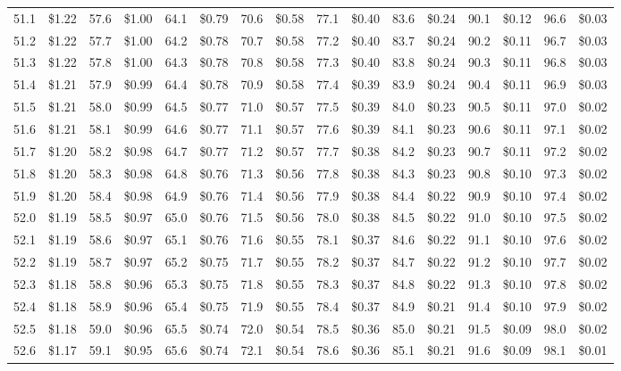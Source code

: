 \documentclass{article}
\begin{document}
\begin{tabular}{|*{8}{rr|}}
51.1 & \$1.22 & 57.6 & \$1.00 & 64.1 & \$0.79 & 70.6 & \$0.58 & 77.1 & \$0.40 & 83.6 & \$0.24 & 90.1 & \$0.12 & 96.6 & \$0.03\\
51.2 & \$1.22 & 57.7 & \$1.00 & 64.2 & \$0.78 & 70.7 & \$0.58 & 77.2 & \$0.40 & 83.7 & \$0.24 & 90.2 & \$0.11 & 96.7 & \$0.03\\
51.3 & \$1.22 & 57.8 & \$1.00 & 64.3 & \$0.78 & 70.8 & \$0.58 & 77.3 & \$0.40 & 83.8 & \$0.24 & 90.3 & \$0.11 & 96.8 & \$0.03\\
51.4 & \$1.21 & 57.9 & \$0.99 & 64.4 & \$0.78 & 70.9 & \$0.58 & 77.4 & \$0.39 & 83.9 & \$0.24 & 90.4 & \$0.11 & 96.9 & \$0.03\\
51.5 & \$1.21 & 58.0 & \$0.99 & 64.5 & \$0.77 & 71.0 & \$0.57 & 77.5 & \$0.39 & 84.0 & \$0.23 & 90.5 & \$0.11 & 97.0 & \$0.02\\
51.6 & \$1.21 & 58.1 & \$0.99 & 64.6 & \$0.77 & 71.1 & \$0.57 & 77.6 & \$0.39 & 84.1 & \$0.23 & 90.6 & \$0.11 & 97.1 & \$0.02\\
51.7 & \$1.20 & 58.2 & \$0.98 & 64.7 & \$0.77 & 71.2 & \$0.57 & 77.7 & \$0.38 & 84.2 & \$0.23 & 90.7 & \$0.11 & 97.2 & \$0.02\\
51.8 & \$1.20 & 58.3 & \$0.98 & 64.8 & \$0.76 & 71.3 & \$0.56 & 77.8 & \$0.38 & 84.3 & \$0.23 & 90.8 & \$0.10 & 97.3 & \$0.02\\
51.9 & \$1.20 & 58.4 & \$0.98 & 64.9 & \$0.76 & 71.4 & \$0.56 & 77.9 & \$0.38 & 84.4 & \$0.22 & 90.9 & \$0.10 & 97.4 & \$0.02\\
52.0 & \$1.19 & 58.5 & \$0.97 & 65.0 & \$0.76 & 71.5 & \$0.56 & 78.0 & \$0.38 & 84.5 & \$0.22 & 91.0 & \$0.10 & 97.5 & \$0.02\\
52.1 & \$1.19 & 58.6 & \$0.97 & 65.1 & \$0.76 & 71.6 & \$0.55 & 78.1 & \$0.37 & 84.6 & \$0.22 & 91.1 & \$0.10 & 97.6 & \$0.02\\
52.2 & \$1.19 & 58.7 & \$0.97 & 65.2 & \$0.75 & 71.7 & \$0.55 & 78.2 & \$0.37 & 84.7 & \$0.22 & 91.2 & \$0.10 & 97.7 & \$0.02\\
52.3 & \$1.18 & 58.8 & \$0.96 & 65.3 & \$0.75 & 71.8 & \$0.55 & 78.3 & \$0.37 & 84.8 & \$0.22 & 91.3 & \$0.10 & 97.8 & \$0.02\\
52.4 & \$1.18 & 58.9 & \$0.96 & 65.4 & \$0.75 & 71.9 & \$0.55 & 78.4 & \$0.37 & 84.9 & \$0.21 & 91.4 & \$0.10 & 97.9 & \$0.02\\
52.5 & \$1.18 & 59.0 & \$0.96 & 65.5 & \$0.74 & 72.0 & \$0.54 & 78.5 & \$0.36 & 85.0 & \$0.21 & 91.5 & \$0.09 & 98.0 & \$0.02\\
52.6 & \$1.17 & 59.1 & \$0.95 & 65.6 & \$0.74 & 72.1 & \$0.54 & 78.6 & \$0.36 & 85.1 & \$0.21 & 91.6 & \$0.09 & 98.1 & \$0.01\\

\end{tabular}
\end{document}
